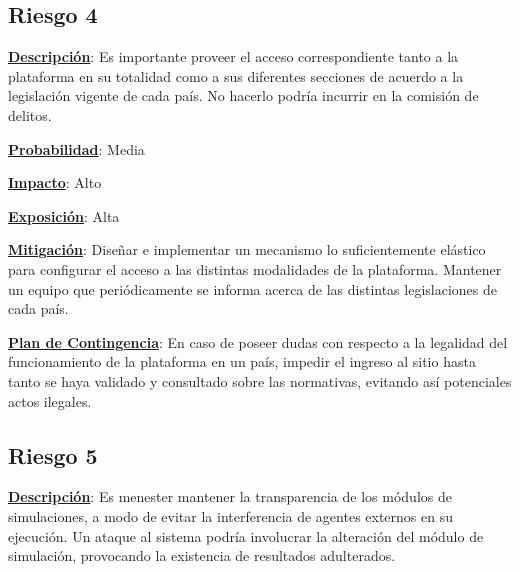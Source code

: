 





\subsection*{Riesgo 4}
\textbf{\underline{Descripción}}: Es importante proveer el acceso correspondiente tanto a la plataforma en su totalidad como a sus diferentes secciones de acuerdo a la legislación vigente de cada país. No hacerlo podría incurrir en la comisión de delitos.

\textbf{\underline{Probabilidad}}: Media

\textbf{\underline{Impacto}}: Alto

\textbf{\underline{Exposición}}: Alta

\textbf{\underline{Mitigación}}: Diseñar e implementar un mecanismo lo suficientemente elástico para configurar el acceso a las distintas modalidades de la plataforma. Mantener un equipo que periódicamente se informa acerca de las distintas legislaciones de cada país.

\textbf{\underline{Plan de Contingencia}}: En caso de poseer dudas con respecto a la legalidad del funcionamiento de la plataforma en un país, impedir el ingreso al sitio hasta tanto se haya validado y consultado sobre las normativas, evitando así potenciales actos ilegales.


\subsection*{Riesgo 5}
\textbf{\underline{Descripción}}: Es menester mantener la transparencia de los módulos de simulaciones, a modo de evitar la interferencia de agentes externos en su ejecución. Un ataque al sistema podría involucrar la alteración del módulo de simulación, provocando la existencia de resultados adulterados.

